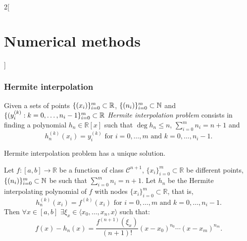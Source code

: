 \documentclass[../../../main.tex]{subfiles}
\begin{document}
\begin{multicols}{2}[\section{Numerical methods}]
\subsubsection{Hermite interpolation}
\begin{definition}
Given a sets of points $\{(x_i)\}_{i=0}^m\subset\mathbb{R}$, $\{(n_i)\}_{i=0}^m\subset\mathbb{N}$ and $\{(y_i^{(k)}:k=0,\ldots,n_i-1\}_{i=0}^m\subset\mathbb{R}$ \textit{Hermite interpolation problem} consists in finding a polynomial $h_n\in\mathbb{R}[x]$ such that $\deg h_n\leq n$, $\sum_{i=0}^mn_i=n+1$ and $$h_n^{(k)}(x_i)=y_i^{(k)}\text{ for }i=0,\ldots,m\text{ and }k=0,\ldots,n_i-1.$$
\end{definition}
\begin{prop}
Hermite interpolation problem has a unique solution.
\end{prop}
\begin{theorem}
Let $f:[a,b]\rightarrow\mathbb{R}$ be a function of class $\mathcal{C}^{n+1}$, $\{x_i\}_{i=0}^m\subset\mathbb{R}$ be different points, $\{(n_i)\}_{i=0}^m\subset\mathbb{N}$ be such that $\sum_{i=0}^mn_i=n+1$. Let $h_n$ be the Hermite interpolating polynomial of $f$ with nodes $\{x_i\}_{i=0}^m\subset\mathbb{R}$, that is, $$h_n^{(k)}(x_i)=f^{(k)}(x_i)\text{ for }i=0,\ldots,m\text{ and }k=0,\ldots,n_i-1.$$ Then $\forall x\in[a,b]$ $\exists\xi_x\in\langle x_0,\ldots,x_n,x\rangle$ such that: $$f(x)-h_n(x)=\frac{f^{(n+1)}(\xi_x)}{(n+1)!}(x-x_0)^{n_0}\cdots(x-x_m)^{n_m}.$$
\end{theorem}

\end{multicols}
\end{document}
